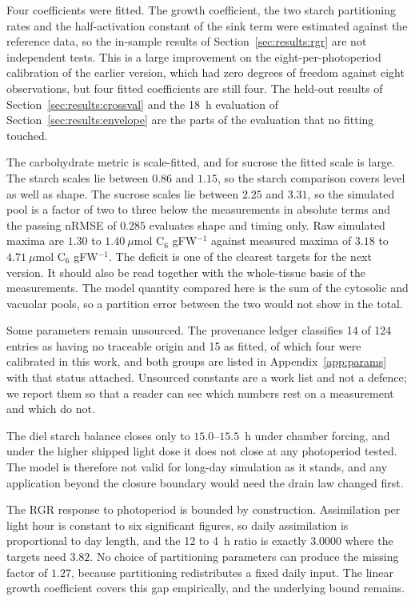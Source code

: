 Four coefficients were fitted. The growth coefficient, the two starch
partitioning rates and the half-activation constant of the sink term were
estimated against the reference data, so the in-sample results of
Section~\ref{sec:results:rgr} are not independent tests. This is a large
improvement on the eight-per-photoperiod calibration of the earlier version,
which had zero degrees of freedom against eight observations, but four fitted
coefficients are still four. The held-out results of
Section~\ref{sec:results:crossval} and the 18~h evaluation of
Section~\ref{sec:results:envelope} are the parts of the evaluation that no
fitting touched.

The carbohydrate metric is scale-fitted, and for sucrose the fitted scale is
large. The starch scales lie between $0.86$ and $1.15$, so the starch
comparison covers level as well as shape. The sucrose scales lie between $2.25$
and $3.31$, so the simulated pool is a factor of two to three below the
measurements in absolute terms and the passing nRMSE of $0.285$ evaluates shape
and timing only. Raw simulated maxima are $1.30$ to $1.40~\mu\mathrm{mol}$
C$_6$ gFW$^{-1}$ against measured maxima of $3.18$ to
$4.71~\mu\mathrm{mol}$ C$_6$ gFW$^{-1}$. The deficit is one of the clearest
targets for the next version. It should also be read together with the
whole-tissue basis of the measurements. The model quantity compared here is the
sum of the cytosolic and vacuolar pools, so a partition error between the two
would not show in the total.

Some parameters remain unsourced. The provenance ledger classifies 14 of 124
entries as having no traceable origin and 15 as fitted, of which four were
calibrated in this work, and both groups are
listed in Appendix~\ref{app:params} with that status attached. Unsourced
constants are a work list and not a defence; we report them so that a reader
can see which numbers rest on a measurement and which do not.

The diel starch balance closes only to $15.0$--$15.5$~h under chamber forcing,
and under the higher shipped light dose it does not close at any photoperiod
tested. The model is therefore not valid for long-day simulation as it stands,
and any application beyond the closure boundary would need the drain law
changed first.

The RGR response to photoperiod is bounded by construction. Assimilation per
light hour is constant to six significant figures, so daily assimilation is
proportional to day length, and the 12 to 4~h ratio is exactly $3.0000$ where
the targets need $3.82$. No choice of partitioning parameters can produce the
missing factor of $1.27$, because partitioning redistributes a fixed daily
input. The linear growth coefficient covers this gap empirically, and the
underlying bound remains.

